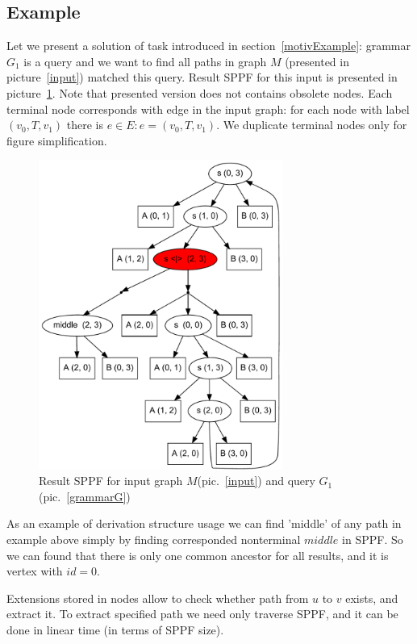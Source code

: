 \subsection{Example}

Let we present a solution of task introduced in section~\ref{motivExample}: grammar $G_1$ is a query and we want to find all paths in graph $M$ (presented in picture~\ref{input}) matched this query.
Result SPPF for this input is presented in picture~\ref{SPPF}. Note that presented version does not contains obsolete nodes.
Each terminal node corresponds with edge in the input graph: for each node with label $(v_0, T, v_1)$ there is $e\in E: e=(v_0,T,v_1)$.
We duplicate terminal nodes only for figure simplification.

\begin{figure}[h]
    \begin{center}
        \includegraphics[width=8cm]{dot/AnBn.pdf}
        \caption{Result SPPF for input graph $M$(pic.~\ref{input}) and query $G_1$(pic.~\ref{grammarG})}
        \label{SPPF}        
    \end{center}
\end{figure}

	
As an example of derivation structure usage we can find 'middle' of any path in example above simply by finding corresponded nonterminal $middle$ in SPPF.
So we can found that there is only one common ancestor for all results, and it is vertex with $id = 0$. 

Extensions stored in nodes allow to check whether path from $u$ to $v$ exists, and extract it. 
To extract specified path we need only traverse SPPF, and it can be done in linear time (in terms of SPPF size). 

